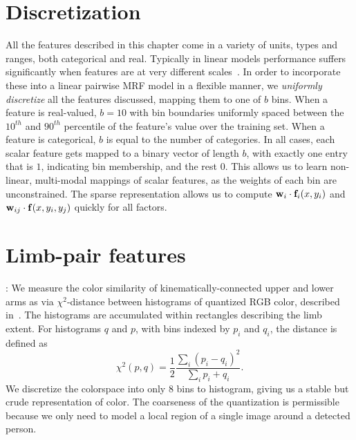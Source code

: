 \section{Discretization}
All the features described in this chapter come in a variety of units, types 
and ranges, both categorical and real.  Typically in linear models performance 
suffers significantly when features are at very different 
scales~\citep{liblinear}.  In order to incorporate these into a linear pairwise 
MRF model in a flexible manner, we {\em uniformly discretize} all the features 
discussed, mapping them to one of $b$ bins.  When a feature is real-valued, $b 
= 10$ with bin boundaries uniformly spaced between the $10^{th}$ and $90^{th}$ 
percentile of the feature's value over the training set.  When a feature is 
categorical, $b$ is equal to the number of categories.  In all cases, each 
scalar feature gets mapped to a binary vector of length $b$, with exactly one 
entry that is $1$, indicating bin membership, and the rest $0$.   This allows 
us to learn non-linear, multi-modal mappings of scalar features, as the weights 
of each bin are unconstrained.  The sparse representation allows us to compute 
$\mathbf{w}_i \cdot \mathbf{f}_i(x,y_i)$ and $\mathbf{w}_{ij} \cdot \mathbf{f}(x,y_i,y_j)$ quickly for all 
factors.


\section{Limb-pair features}\label{sec:limb-limb}
: We measure the color similarity of 
kinematically-connected upper and lower arms as via $\chi^2$-distance between 
histograms of quantized RGB color, described in~.  The histograms 
are accumulated within rectangles describing the limb extent. For histograms 
$q$ and $p$, with bins indexed by $p_i$ and $q_i$, the distance is defined as
$$\chi^2(p,q) = \frac{1}{2} \frac{\sum_i (p_i - q_i)^2}{\sum_i p_i + q_i}.$$  
We discretize the colorspace into only $8$ bins to histogram, giving us a 
stable but crude representation of color.  The coarseness of the quantization 
is permissible because we only need to model a local region of a single image 
around a detected person.


